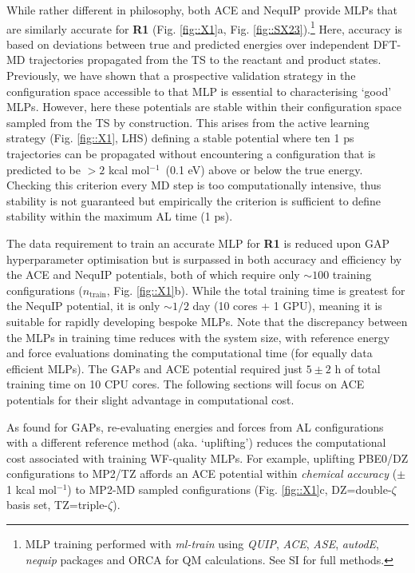 \documentclass[twoside,twocolumn,9pt]{article}
\newcommand{\kcal}{kcal mol$^{-1}$}
\begin{document}
While rather different in philosophy, both ACE and NequIP provide MLPs that are similarly accurate for {\bfseries{R1}} (Fig. \ref{fig::X1}a, Fig. \ref{fig::SX23}).\footnote[4]{MLP training performed with \emph{ml-train}\cite{Young2021mlt} using \emph{QUIP},\cite{Csanyi_libAtoms_QUIP_2021} \emph{ACE},\cite{Ortner_ACE} \emph{ASE},\cite{HjorthLarsen2017} \emph{autodE},\cite{autodE} \emph{nequip}\cite{nequip_github} packages and ORCA\cite{Neese2017} for QM calculations. See SI for full methods.} Here, accuracy is based on deviations between true and predicted energies over independent DFT-MD trajectories propagated from the TS to the reactant and product states. Previously, we have shown that a prospective validation strategy in the configuration space accessible to that MLP is essential to characterising `good’ MLPs.\cite{Young2021gap} However, here these potentials are stable within their configuration space sampled from the TS by construction. This arises from the active learning strategy (Fig. \ref{fig::X1}, LHS) defining a stable potential where ten 1 ps trajectories can be propagated without encountering a configuration that is predicted to be $>2$ \kcal~(0.1 eV) above or below the true energy. Checking this criterion every MD step is too computationally intensive, thus stability is not guaranteed but empirically the criterion is sufficient to define stability within the maximum AL time (1 ps).


The data requirement to train an accurate MLP for {\bfseries{R1}} is reduced upon GAP hyperparameter optimisation but is surpassed in both accuracy and efficiency by the ACE and NequIP potentials, both of which require only $\sim100$ training configurations ($n_\text{train}$, Fig. \ref{fig::X1}b). While the total training time is greatest for the NequIP potential, it is only $\sim1/2$ day (10 cores + 1 GPU), meaning it is suitable for rapidly developing bespoke MLPs. Note that the discrepancy between the MLPs in training time reduces with the system size, with reference energy and force evaluations dominating the computational time (for equally data efficient MLPs). The GAPs and ACE potential required just $5\pm2$ h of total training time on 10 CPU cores. The following sections will focus on ACE potentials for their slight advantage in computational cost.


As found for GAPs, re-evaluating energies and forces from AL configurations with a different reference method (aka. `uplifting’) reduces the computational cost associated with training WF-quality MLPs. For example, uplifting PBE0/DZ configurations to MP2/TZ affords an ACE potential within \emph{chemical accuracy} ($\pm$ 1 \kcal)  to MP2-MD sampled configurations (Fig. \ref{fig::X1}c, DZ=double-$\zeta$ basis set, TZ=triple-$\zeta$).
\end{document}

